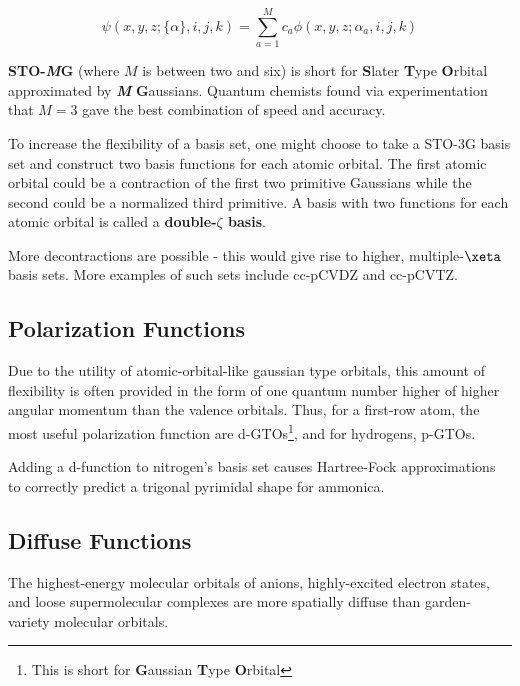 \documentclass[
  letterpaper,
  DIV=11,
  numbers=noendperiod]{scrreprt}
\begin{document}
\begin{equation}
  \psi(x, y, z; \{\alpha\}, i, j, k) = \sum_{a = 1}^Mc_a\phi(x, y, z; \alpha_a, i, j, k)
\end{equation}

\textbf{STO-\emph{M}G} (where \(M\) is between two and six) is short for
\textbf{S}later \textbf{T}ype \textbf{O}rbital approximated by
\textbf{\emph{M}} \textbf{G}aussians. Quantum chemists found via
experimentation that \(M = 3\) gave the best combination of speed and
accuracy.

To increase the flexibility of a basis set, one might choose to take a
STO-3G basis set and construct two basis functions for each atomic
orbital. The first atomic orbital could be a contraction of the first
two primitive Gaussians while the second could be a normalized third
primitive. A basis with two functions for each atomic orbital is called
a \textbf{double-\(\zeta\) basis}.

More decontractions are possible - this would give rise to higher,
multiple-\(\xeta\) basis sets. More examples of such sets include
cc-pCVDZ and cc-pCVTZ.

\hypertarget{polarization-functions}{%
\subsection{Polarization Functions}\label{polarization-functions}}

Due to the utility of atomic-orbital-like gaussian type orbitals, this
amount of flexibility is often provided in the form of one quantum
number higher of higher angular momentum than the valence orbitals.
Thus, for a first-row atom, the most useful polarization function are
d-GTOs\footnote{This is short for \textbf{G}aussian \textbf{T}ype
  \textbf{O}rbital}, and for hydrogens, p-GTOs.

Adding a d-function to nitrogen's basis set causes Hartree-Fock
approximations to correctly predict a trigonal pyrimidal shape for
ammonica.

\hypertarget{diffuse-functions}{%
\subsection{Diffuse Functions}\label{diffuse-functions}}

The highest-energy molecular orbitals of anions, highly-excited electron
states, and loose supermolecular complexes are more spatially diffuse
than garden-variety molecular orbitals.
\end{document}
